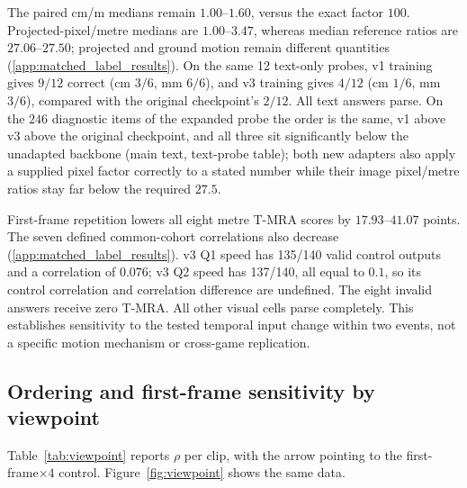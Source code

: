 \documentclass[11pt]{article}
\newcommand{\rhosp}{\ensuremath{\rho}}
\begin{document}
The paired cm/m medians remain $1.00$--$1.60$, versus the exact factor
$100$. Projected-pixel/metre medians are $1.00$--$3.47$, whereas median
reference ratios are $27.06$--$27.50$; projected and ground motion remain
different quantities (\ref{app:matched_label_results}). On the same
12 text-only probes, v1 training gives $9/12$ correct (cm $3/6$, mm $6/6$),
and v3 training gives $4/12$ (cm $1/6$, mm $3/6$), compared with the original
checkpoint's $2/12$. All text answers parse. On the $246$ diagnostic items of
the expanded probe the order is the same, v1 above v3 above the original
checkpoint, and all three sit significantly below the unadapted backbone
(main text, text-probe table); both new adapters also apply a supplied pixel
factor correctly to a stated number while their image pixel/metre ratios stay
far below the required $27.5$.

First-frame repetition lowers all eight metre T-MRA scores by
$17.93$--$41.07$ points. The seven defined common-cohort correlations
also decrease (\ref{app:matched_label_results}). v3 Q1 speed has
135/140 valid control outputs and a correlation of $0.076$; v3 Q2 speed
has 137/140, all equal to $0.1$, so its control correlation and correlation
difference are undefined. The eight invalid answers receive zero T-MRA.
All other visual cells parse completely. This establishes sensitivity to
the tested temporal input change within two events, not a specific motion
mechanism or cross-game replication.

\subsection{Ordering and first-frame sensitivity by viewpoint}
\label{sec:e1a}

Table~\ref{tab:viewpoint} reports \rhosp{} per clip, with the arrow pointing to
the first-frame$\times 4$ control. Figure~\ref{fig:viewpoint} shows the same
data.
\end{document}

